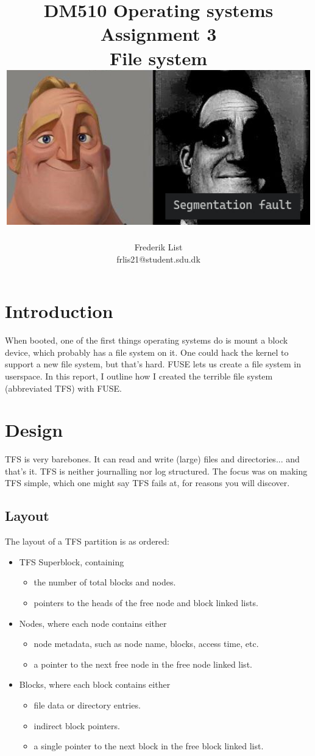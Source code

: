 \documentclass{report}
\title{
	DM510 Operating systems \\
	Assignment 3 \\
	\normalsize File system \\
	\vspace{1cm}
	\includegraphics[width=0.99\textwidth, frame]{traummrinc}
}
\author{
	Frederik List \\
	\small frlis21@student.sdu.dk \\
}
\begin{document}
\maketitle

\section*{Introduction}

When booted, one of the first things operating systems do
is mount a block device, which probably has a file system on it.
One could hack the kernel to support a new file system, but that's hard.
FUSE lets us create a file system in userspace.
In this report, I outline how I created the terrible file system
(abbreviated TFS) with FUSE.

\section*{Design}

TFS is very barebones.
It can read and write (large) files and directories... and that's it.
TFS is neither journalling nor log structured.
The focus was on making TFS simple, which one might say TFS fails at,
for reasons you will discover.

\subsection*{Layout}

The layout of a TFS partition is as ordered:

\begin{itemize}
	\item TFS Superblock, containing
	      \begin{itemize}
		      \item the number of total blocks and nodes.
		      \item pointers to the heads of the free node and block linked lists.
	      \end{itemize}
	\item Nodes, where each node contains either
	      \begin{itemize}
		      \item node metadata, such as node name, blocks, access time, etc.
		      \item a pointer to the next free node in the free node linked list.
	      \end{itemize}
	\item Blocks, where each block contains either
	      \begin{itemize}
		      \item file data or directory entries.
		      \item indirect block pointers.
		      \item a single pointer to the next block in the free block linked list.
	      \end{itemize}
\end{itemize}
\end{document}
